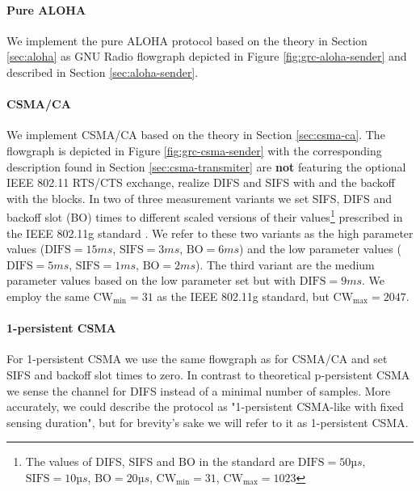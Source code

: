 \paragraph{Pure ALOHA}
We implement the pure ALOHA protocol based on the theory in Section \ref{sec:aloha} as GNU Radio flowgraph depicted in Figure \ref{fig:grc-aloha-sender} and described in Section \ref{sec:aloha-sender}.

\paragraph{CSMA/CA}
We implement CSMA/CA based on the theory in Section \ref{sec:csma-ca}. The flowgraph is depicted in Figure \ref{fig:grc-csma-sender} with the corresponding description found in Section \ref{sec:csma-transmiter} are \textbf{not} featuring the optional IEEE 802.11 RTS/CTS exchange, realize DIFS and SIFS with  and the backoff with the  blocks. In two of three measurement variants we set SIFS, DIFS and backoff slot (BO) times to different scaled versions of their values\footnote{The values of DIFS, SIFS and BO in the standard are $\text{DIFS}=50 µs$, $\text{SIFS}=10 µs$, $\text{BO}=20 µs$, $\text{CW}_\text{min}=31$,  $\text{CW}_\text{max}=1023$} prescribed in the IEEE 802.11g standard \cite{802.11g}. We refer to these two variants as the high parameter values ($\text{DIFS}=15 ms$, $\text{SIFS}=3 ms$, $\text{BO}=6 ms$) and the low parameter values ($\text{DIFS}=5 ms$, $\text{SIFS}=1 ms$, $\text{BO}=2 ms$). The third variant are the medium parameter values based on the low parameter set but with $\text{DIFS}=9 ms$. We employ the same $\text{CW}_\text{min}=31$ as the IEEE 802.11g standard, but $\text{CW}_\text{max}=2047$.

\paragraph{1-persistent CSMA}
For 1-persistent CSMA we use the same flowgraph as for CSMA/CA and set SIFS and backoff slot times to zero. In contrast to theoretical p-persistent CSMA we sense the channel for DIFS instead of a minimal number of samples. More accurately, we could describe the protocol as "1-persistent CSMA-like with fixed sensing duration", but for brevity's sake we will refer to it as 1-persistent CSMA.  
 
